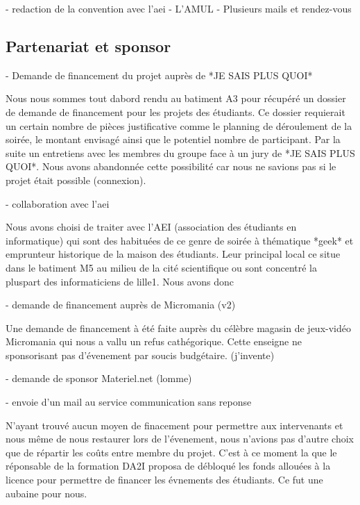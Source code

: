 - redaction de la convention avec l'aei
- L'AMUL
- Plusieurs mails et rendez-vous

\subsection{Partenariat et sponsor} %
\label{sub:partenariat_et_sponsor}

- Demande de financement du projet auprès de *JE SAIS PLUS QUOI*

  Nous nous sommes tout dabord rendu au batiment A3
  pour récupéré un dossier de demande de financement pour les projets des
  étudiants. Ce dossier requierait un certain nombre de pièces
  justificative comme le planning de déroulement de la soirée, le montant
  envisagé ainsi que le potentiel nombre de participant. Par la suite un
  entretiens avec les membres du groupe face à un jury de *JE SAIS
  PLUS QUOI*. Nous avons abandonnée cette possibilité car nous ne savions
  pas si le projet était possible (connexion).

- collaboration avec l'aei

  Nous avons choisi de traiter avec l'AEI (association des étudiants
  en informatique) qui sont des habituées de ce genre de soirée à
  thématique *geek* et emprunteur historique de la maison des étudiants.
  Leur principal local ce situe dans le batiment M5 au milieu de la
  cité scientifique ou sont concentré la pluspart des informaticiens de
  lille1.
  Nous avons donc 

- demande de financement auprès de Micromania (v2)

  Une demande de financement à été faite auprès du célèbre magasin de
  jeux-vidéo Micromania qui nous a vallu un refus cathégorique. Cette
  enseigne ne sponsorisant pas d'évenement par soucis
  budgétaire. (j'invente)

- demande de sponsor Materiel.net (lomme)

- envoie d'un mail au service communication sans reponse

  N'ayant trouvé aucun moyen de finacement pour permettre aux
  intervenants et nous même de nous restaurer lors de l'évenement, nous
  n'avions pas d'autre choix que de répartir les coûts entre membre du
  projet. C'est à ce moment la que le réponsable de la formation DA2I
  proposa de débloqué les fonds allouées à la licence pour permettre de
  financer les évnements des étudiants. Ce fut une aubaine pour nous.

